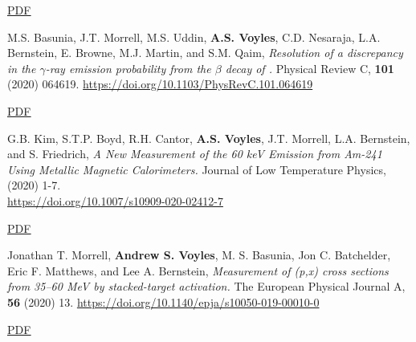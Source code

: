 \begin{bibsection}
\ifshort \vspace{0.1cm} \href{https://avoyles.github.io/papers/Uddin2020_86Y.pdf}{\underline{PDF}} \else  \fi 

\item M.S. Basunia, J.T. Morrell, M.S. Uddin, \textbf{A.S. Voyles}, C.D. Nesaraja, L.A. Bernstein, E. Browne, M.J. Martin, and S.M. Qaim, \emph{Resolution of a discrepancy in the $\gamma$-ray emission probability from the $\beta$ decay of .} Physical Review C, \textbf{101} (2020) 064619. \url{https://doi.org/10.1103/PhysRevC.101.064619} 

\ifshort \vspace{0.1cm} \href{https://avoyles.github.io/papers/Basunia2020_BR.pdf}{\underline{PDF}} \else  \fi 





\item G.B. Kim, S.T.P. Boyd, R.H. Cantor, \textbf{A.S. Voyles}, J.T. Morrell, L.A. Bernstein, and S. Friedrich, \emph{A New Measurement of the 60 keV Emission from Am-241 Using Metallic Magnetic Calorimeters.} Journal of Low Temperature Physics,  (2020) 1-7. \\\url{https://doi.org/10.1007/s10909-020-02412-7} 

\ifshort \vspace{0.1cm} \href{https://avoyles.github.io/papers/Kim2020_Calorimeter.pdf}{\underline{PDF}} \else  \fi 




\item Jonathan T. Morrell, \textbf{Andrew S. Voyles}, M. S. Basunia, Jon C. Batchelder, Eric F. Matthews, and Lee A. Bernstein, \emph{Measurement of (p,x) cross sections from 35--60 MeV by stacked-target activation.} The European Physical Journal A, \textbf{56} (2020) 13. \url{https://doi.org/10.1140/epja/s10050-019-00010-0} 

\ifshort \vspace{0.1cm} \href{https://avoyles.github.io/papers/Morrell2020_LaCe.pdf}{\underline{PDF}} \else  \fi 



\end{bibsection}
